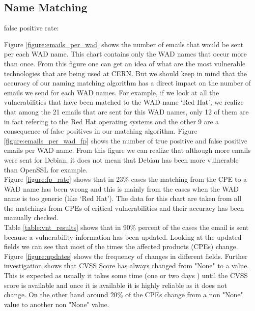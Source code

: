 \subsection{Name Matching }
false positive rate:

Figure \ref{figure:emails_per_wad} shows the number of emails that would be sent per each WAD name. This chart contains only the WAD names that occur more than once. From this figure one can get an idea of what are the most vulnerable technologies that are being used at CERN. But we should keep in mind that the accuracy of our naming matching algorithm has a direct impact on the number of emails we send for each WAD names. For example, if we look at all the vulnerabilities that have been matched to the WAD name `Red Hat', we realize that among the 21 emails that are sent for this WAD names, only 12 of them are in fact refering to the Red Hat operating systems and the  other 9 are a consequence of false positives in our matching algorithm. Figure \ref{figure:emails_per_wad_fp} shows the number of true positive and false positive emails per WAD name. From this figure we can realize that although more emails were sent for Debian, it does not mean that Debian has been more vulnerable than OpenSSL for example.
\\
Figure \ref{figure:fp_rate} shows that in 23\% cases the matching from the CPE to a WAD name has been wrong and this is mainly from the cases when the WAD name is too generic (like `Red Hat'). The data for this chart are taken from all the matchings from CPEs of critical vulnerabilities and their accuracy has been manually checked. 
\\
Table \ref{table:vnt_results} shows that in 90\% percent of the cases the email is sent because a vulnerability information has been updated. Looking at the updated fields we can see that most of the times the affected products (CPEs) change. Figure \ref{figure:updates} shows the frequency of changes in different fields. Further investigation shows that CVSS Score has always changed from "None" to a value. This is expected as usually it takes some time (one or two days	) until the CVSS score is available and once it is available it is highly reliable as it does not change. On the other hand around 20\% of the CPEs change from a non "None" value to another non "None" value.









